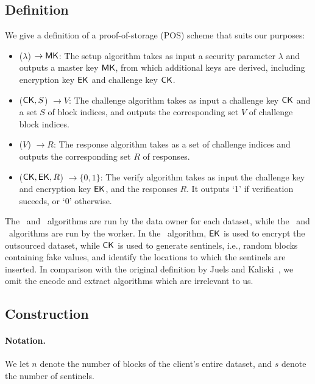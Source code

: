 \subsection{Definition} \label{sect:pos-definition}

We give a definition of a proof-of-storage (POS) scheme that suits our purposes:
\begin{itemize}
\item \Setup($\lambda$) $\rightarrow \textsf{\textup{MK}}$: The setup algorithm takes as input a security parameter $\lambda$ and outputs a master key $\textsf{\textup{MK}}$, from which additional keys are derived, including encryption key $\textsf{\textup{EK}}$ and challenge key $\textsf{\textup{CK}}$. 

\item \Challenge($\textsf{\textup{CK}}, S$) $\rightarrow V$: The challenge algorithm takes as input a challenge key $\textsf{\textup{CK}}$ and a set $S$ of block indices, and outputs the corresponding set $V$ of challenge block indices.

\item \Response($V$) $\rightarrow R$: The response algorithm takes as a set of challenge indices and outputs the corresponding set $R$ of responses.

\item \Verify($\textsf{\textup{CK}}, \textsf{\textup{EK}}, R$) $\rightarrow \{0,1\}$: The verify algorithm takes as input the challenge key and encryption key $\textsf{\textup{EK}}$, and the responses $R$. It outputs `1' if verification suceeds, or `0' otherwise.
\end{itemize}

The \Setup~and \Verify~algorithms are run by the data owner for each dataset, while the \Challenge~and \Response~algorithms are run by the worker.
In the \Setup~algorithm, $\textsf{\textup{EK}}$ is used to encrypt the outsourced dataset, while $\textsf{\textup{CK}}$ is used to generate sentinels, i.e., random blocks containing fake values, and identify the locations to which the sentinels are inserted.
In comparison with the original definition by Juels and Kaliski~\cite{JK07}, we omit the encode and extract algorithms which are irrelevant to us.

\subsection{Construction} \label{sect:pos-construction}

\paragraph{Notation.}
We let $n$ denote the number of blocks of the client's entire dataset, and $s$ denote the number of sentinels.



